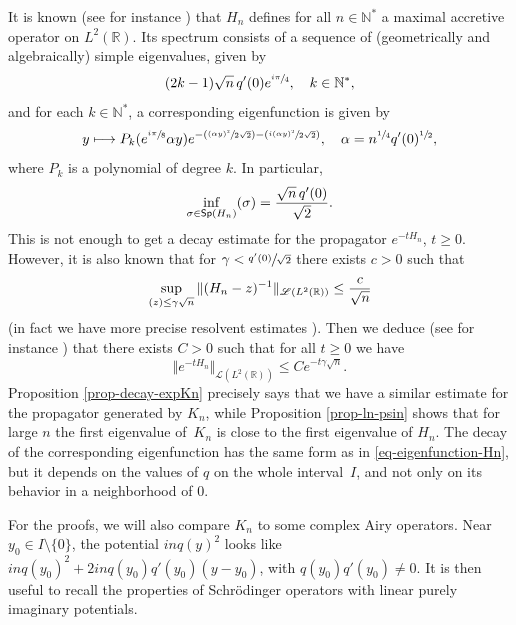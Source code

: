 \documentclass[10pt]{amsart}
\let\mathcal\mathscr
\def\mto{\mathchoice{\longmapsto}{\mapsto}{\mapsto}{\mapsto}}
\newcommand{\Psfrac}[2]{(\sfrac{#1}{#2})}
\theoremstyle{plain}
\theoremstyle{definition}
\newcommand{\nr}[1]{\Vert #1\Vert}
\newcommand{\set}[1]{\{ #1\}}
\newcommand{\inv}{^{-1}}
\newcommand{\1}{\mathds 1}
\let\Re\relax
\DeclareMathOperator{\Re}{\mathsf{Re}\mkern2mu}
\newcommand{\Sp}{\mathsf{Sp}}
\newcommand{\R}{\mathbb{R}}
\newcommand{\N}{\mathbb{N}}
\let\a\alpha
\let\g\gamma
\let\s\sigma
\newcommand{\Lc}{{\mathcal L}}
\begin{document}
It is known (see for instance \cite[\S 14.4]{helffer}) that $H_n$ defines for all $n \in \N^*$ a maximal accretive operator on $L^2(\R)$. Its spectrum consists of a sequence of (geometrically and algebraically) simple eigenvalues, given by
\[
(2k - 1) \sqrt n\, q'(0) e^{\sfrac {i\pi}4} , \quad k \in \N^*,
\]
and for each $k \in \N^*$, a corresponding eigenfunction is given by
\begin{equation} \label{eq-eigenfunction-Hn}
y \mto P_k(e^{\sfrac {i\pi}8} \a y) e^{- \Psfrac {(\a y)^2}{2\sqrt 2} - \Psfrac {i(\a y)^2}{2\sqrt 2}}, \quad \a = n^{\sfrac 14} q'(0)^{\sfrac 12},
\end{equation}
where $P_k$ is a polynomial of degree $k$. In particular,
\[
\inf_{\s \in \Sp(H_n)} \Re(\s) = \frac {\sqrt n\,q'(0)}{\sqrt 2}.
\]
This is not enough to get a decay estimate for the propagator $e^{-t H_n}$, $t \geq 0$. However, it is also known that for $\gamma < \sfrac {q'(0)}{\sqrt 2}$ there exists $c > 0$ such that
\begin{equation} \label{estim-Hn-resolvent}
\sup_{\Re(z) \leq \g \sqrt n} \nr{(H_n-z)\inv}_{\Lc(L^2(\R))} \leq \frac {c}{\sqrt n}
\end{equation}
(in fact we have more precise resolvent estimates \cite{HitrikSjoVio13,KrejcirikSieTatVio15}). Then we deduce (see for instance \cite[Th. V.1.11]{engel}) that there exists $C > 0$ such that for all $t \geq 0$ we have
\begin{equation} \label{estim-Hn-propagator}
\nr{e^{-tH_n}}_{\Lc(L^2(\R))} \leq C e^{-t\gamma \sqrt n}.
\end{equation}
Proposition \ref{prop-decay-expKn} precisely says that we have a similar estimate for the propagator generated by $K_n$, while Proposition \ref{prop-ln-psin} shows that for large $n$ the first eigenvalue of~$K_n$ is close to the first eigenvalue of $H_n$. The decay of the corresponding eigenfunction has the same form as in \eqref{eq-eigenfunction-Hn}, but it depends on the values of $q$ on the whole interval~$I$, and not only on its behavior in a neighborhood of 0.

For the proofs, we will also compare $K_n$ to some complex Airy operators. Near $y_0 \in I \setminus \set 0$, the potential $in q(y)^2$ looks like $inq(y_0)^2 + 2in q(y_0) q'(y_0) (y-y_0)$, with $q(y_0) q'(y_0) \neq 0$. It is then useful to recall the properties of Schrödinger operators with linear purely imaginary potentials.
\end{document}
